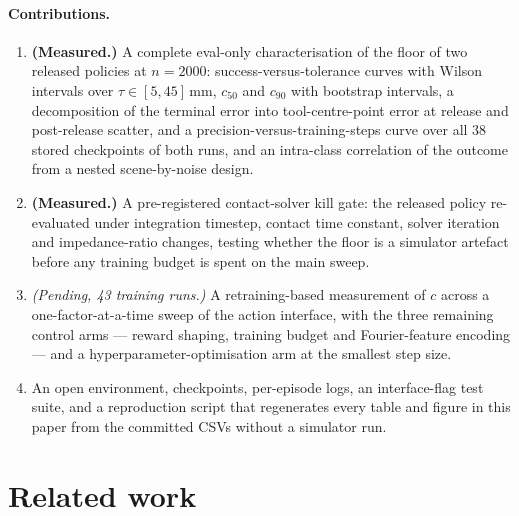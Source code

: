 \documentclass{article}
\newcommand{\planned}[1]{{\color{blue!70!black}\textit{#1}}}
\begin{document}
\paragraph{Contributions.}
\begin{enumerate}[nosep,leftmargin=*]
\item \textbf{(Measured.)} A complete eval-only characterisation of the floor of
two released policies at $n{=}2000$: success-versus-tolerance curves with
Wilson intervals over $\tau \in [5, 45]$\,mm, $c_{50}$ and $c_{90}$ with
bootstrap intervals, a decomposition of the terminal error into
tool-centre-point error at release and post-release scatter, and a
precision-versus-training-steps curve over all 38 stored checkpoints of both
runs, and an intra-class correlation of the outcome from a nested
scene-by-noise design.
\item \textbf{(Measured.)} A pre-registered contact-solver kill gate: the
released policy re-evaluated under integration timestep, contact time constant,
solver iteration and impedance-ratio changes, testing whether the floor is a
simulator artefact before any training budget is spent on the main sweep.
\item \planned{(Pending, 43 training runs.)} A retraining-based measurement of
$c$ across a one-factor-at-a-time sweep of the action interface, with the three
remaining control arms --- reward shaping, training budget and Fourier-feature
encoding --- and a hyperparameter-optimisation arm at the smallest step size.
\item An open environment, checkpoints, per-episode logs, an interface-flag
test suite, and a reproduction script that regenerates every table and figure
in this paper from the committed CSVs without a simulator run.
\end{enumerate}

\section{Related work}
\label{sec:related}
\end{document}
